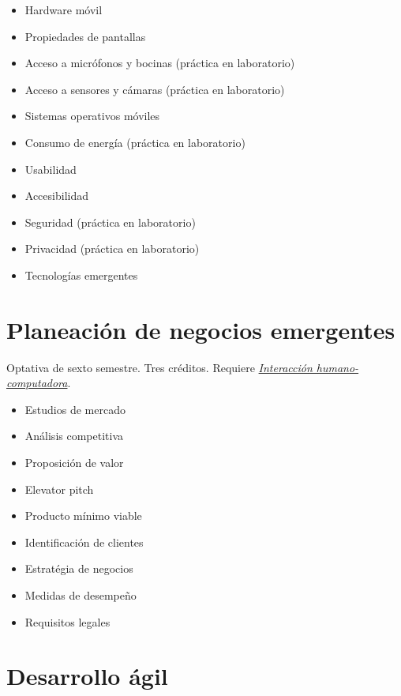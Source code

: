\documentclass{article}
\begin{document}
\begin{multicols}{4}
\begin{itemize}
\item{Hardware m\'{o}vil}
\item{Propiedades de pantallas}  
\item{Acceso a micr\'{o}fonos y bocinas (pr\'{a}ctica en laboratorio)}  
\item{Acceso a sensores y c\'{a}maras (pr\'{a}ctica en laboratorio)}      
\item{Sistemas operativos m\'{o}viles}
\item{Consumo de energ\'{i}a (pr\'{a}ctica en laboratorio)}  
\item{Usabilidad}
\item{Accesibilidad}
\item{Seguridad (pr\'{a}ctica en laboratorio)}  
\item{Privacidad (pr\'{a}ctica en laboratorio)}  
\item{Tecnolog\'{i}as emergentes}
\end{itemize}

\newpage

\hypertarget{pdne}{\section*{Planeaci\'{o}n de negocios emergentes}}

Optativa de sexto semestre. Tres cr\'{e}ditos. Requiere
\hyperlink{ihc}{\em Interacci\'{o}n humano-computadora}.

\begin{itemize}
\item{Estudios de mercado}
\item{An\'{a}lisis competitiva}
\item{Proposici\'{o}n de valor}
\item{Elevator pitch}
\item{Producto m\'{i}nimo viable}
\item{Identificaci\'{o}n de clientes}
\item{Estrat\'{e}gia de negocios}
\item{Medidas de desempe\~{n}o}
\item{Requisitos legales}
\end{itemize}

\vfill\null \columnbreak

\hypertarget{da}{\section*{Desarrollo \'{a}gil}} 


\end{multicols}
\end{document}
